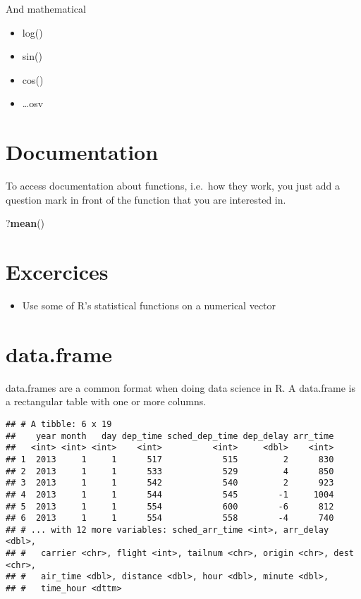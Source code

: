 \documentclass[]{book}
\newenvironment{Shaded}{\begin{snugshade}}{\end{snugshade}}
\newcommand{\KeywordTok}[1]{\textcolor[rgb]{0.13,0.29,0.53}{\textbf{#1}}}
\newcommand{\NormalTok}[1]{#1}
\providecommand{\tightlist}{%
  \setlength{\itemsep}{0pt}\setlength{\parskip}{0pt}}
\begin{document}
And mathematical

\begin{itemize}
\tightlist
\item
  log()
\item
  sin()
\item
  cos()
\item
  \ldots{}osv
\end{itemize}

\hypertarget{documentation}{%
\section{Documentation}\label{documentation}}

To access documentation about functions, i.e.~how they work, you just add a question mark in front of the function that you are interested in.

\begin{Shaded}
\begin{Highlighting}[]
\NormalTok{?}\KeywordTok{mean}\NormalTok{()}
\end{Highlighting}
\end{Shaded}

\hypertarget{excercices}{%
\section{Excercices}\label{excercices}}

\begin{itemize}
\tightlist
\item
  Use some of R's statistical functions on a numerical vector
\end{itemize}

\hypertarget{data.frame}{%
\section{data.frame}\label{data.frame}}

data.frames are a common format when doing data science in R. A data.frame is a rectangular table with one or more columns.

\begin{verbatim}
## # A tibble: 6 x 19
##    year month   day dep_time sched_dep_time dep_delay arr_time
##   <int> <int> <int>    <int>          <int>     <dbl>    <int>
## 1  2013     1     1      517            515         2      830
## 2  2013     1     1      533            529         4      850
## 3  2013     1     1      542            540         2      923
## 4  2013     1     1      544            545        -1     1004
## 5  2013     1     1      554            600        -6      812
## 6  2013     1     1      554            558        -4      740
## # ... with 12 more variables: sched_arr_time <int>, arr_delay <dbl>,
## #   carrier <chr>, flight <int>, tailnum <chr>, origin <chr>, dest <chr>,
## #   air_time <dbl>, distance <dbl>, hour <dbl>, minute <dbl>,
## #   time_hour <dttm>
\end{verbatim}
\end{document}
